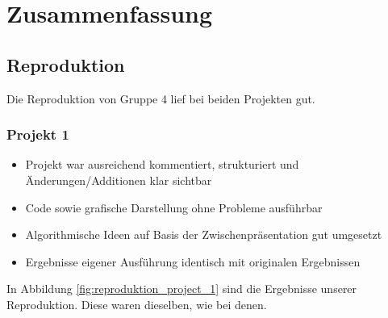 \chapter{Zusammenfassung}
\label{chapter:kap5}

\section{Reproduktion}
    Die Reproduktion von Gruppe 4 lief bei beiden Projekten gut. 
    
    \subsection{Projekt 1}
        \begin{itemize}
            \item Projekt war ausreichend kommentiert, strukturiert und Änderungen/Additionen klar sichtbar
            \item Code sowie grafische Darstellung ohne Probleme ausführbar
            \item Algorithmische Ideen auf Basis der Zwischenpräsentation gut umgesetzt
            \item Ergebnisse eigener Ausführung identisch mit originalen Ergebnissen
        \end{itemize}

        In Abbildung \ref{fig:reproduktion_project_1} sind die Ergebnisse unserer Reproduktion. Diese waren dieselben, wie bei denen.

